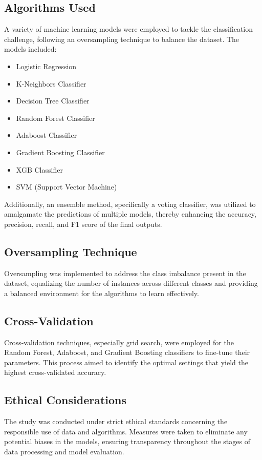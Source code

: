 \documentclass[a4paper,num-refs,gigabyte]{oup-contemporary}
\begin{document}
\subsection{Algorithms Used}
A variety of machine learning models were employed to tackle the classification challenge, following an oversampling technique to balance the dataset. The models included:
\begin{itemize}
    \item Logistic Regression
    \item K-Neighbors Classifier
    \item Decision Tree Classifier
    \item Random Forest Classifier
    \item Adaboost Classifier
    \item Gradient Boosting Classifier
    \item XGB Classifier
    \item SVM (Support Vector Machine)
\end{itemize}
Additionally, an ensemble method, specifically a voting classifier, was utilized to amalgamate the predictions of multiple models, thereby enhancing the accuracy, precision, recall, and F1 score of the final outputs.

\subsection{Oversampling Technique}
Oversampling was implemented to address the class imbalance present in the dataset, equalizing the number of instances across different classes and providing a balanced environment for the algorithms to learn effectively.

\subsection{Cross-Validation}
Cross-validation techniques, especially grid search, were employed for the Random Forest, Adaboost, and Gradient Boosting classifiers to fine-tune their parameters. This process aimed to identify the optimal settings that yield the highest cross-validated accuracy.

\subsection{Ethical Considerations}
The study was conducted under strict ethical standards concerning the responsible use of data and algorithms. Measures were taken to eliminate any potential biases in the models, ensuring transparency throughout the stages of data processing and model evaluation.
\end{document}
